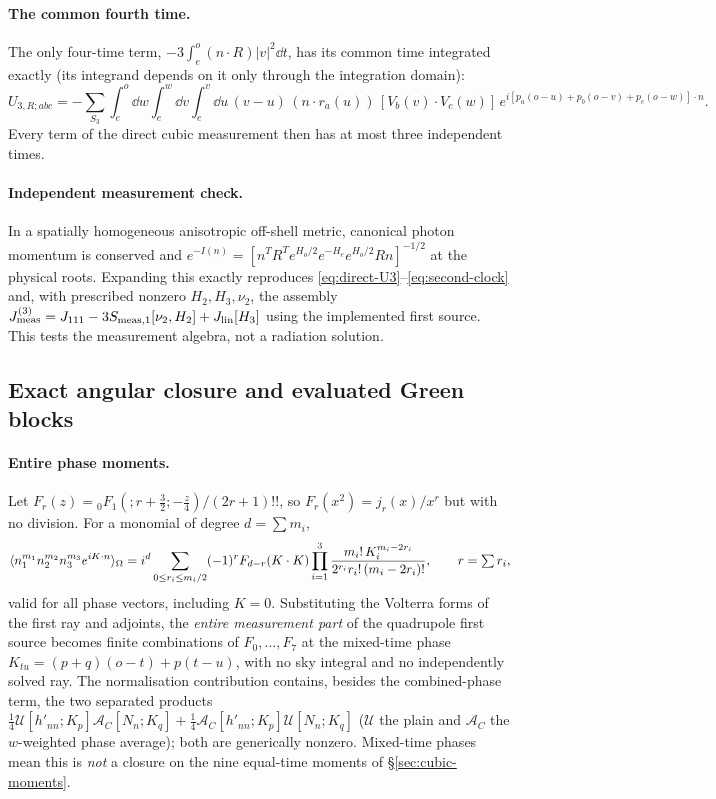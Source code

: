 \paragraph{The common fourth time.} The only four-time term,
$-3\int_e^o(n\cdot R)|v|^2\dd t$, has its common time integrated exactly (its integrand depends on
it only through the integration domain):
\[
 U_{3,R;abc}=-\sum_{S_3}\int_e^o\!\dd w\!\int_e^w\!\dd v\!\int_e^v\!\dd u\,(v-u)\,
 (n\cdot r_a(u))\,[V_b(v)\cdot V_c(w)]\,e^{i[p_a(o-u)+p_b(o-v)+p_c(o-w)]\cdot n}.
\]
Every term of the direct cubic measurement then has at most three independent times.

\paragraph{Independent measurement check.} In a spatially homogeneous anisotropic off-shell
metric, canonical photon momentum is conserved and
$e^{-I(n)}=[n^TR^Te^{H_o/2}e^{-H_e}e^{H_o/2}Rn]^{-1/2}$ at the physical roots. Expanding this
exactly reproduces \eqref{eq:direct-U3}--\eqref{eq:second-clock} and, with prescribed nonzero
$H_2,H_3,\nu_2$, the assembly $J_{\rm meas}^{(3)}=J_{111}-3S_{{\rm meas},1}[\nu_2,H_2]+J_{\rm lin}[H_3]$
using the implemented first source. This tests the measurement algebra, not a radiation solution.

\subsection{Exact angular closure and evaluated Green blocks}\label{sec:angular-green}
\paragraph{Entire phase moments.} Let
$F_r(z)={}_0F_1(;r+\frac32;-\frac z4)/(2r+1)!!$, so $F_r(x^2)=j_r(x)/x^r$ but with no
division. For a monomial of degree $d=\sum m_i$,
\begin{equation}\label{eq:phase-moments}
 \langle n_1^{m_1}n_2^{m_2}n_3^{m_3}e^{iK\cdot n}\rangle_{\Omega}
 =i^d\sum_{0\le r_i\le m_i/2}(-1)^{r}F_{d-r}(K\cdot K)
 \prod_{i=1}^3\frac{m_i!\,K_i^{m_i-2r_i}}{2^{r_i}r_i!\,(m_i-2r_i)!},\qquad r=\textstyle\sum r_i,
\end{equation}
valid for all phase vectors, including $K=0$. Substituting the Volterra forms of the first ray
and adjoints, the \emph{entire measurement part} of the quadrupole first source becomes finite
combinations of $F_0,\dots,F_7$ at the mixed-time phase $K_{tu}=(p+q)(o-t)+p(t-u)$, with no
sky integral and no independently solved ray. The normalisation contribution contains, besides
the combined-phase term, the two separated products
$\frac14\mathcal U[h'_{nn};K_p]\mathcal A_C[N_n;K_q]+\frac14\mathcal A_C[h'_{nn};K_p]\mathcal U[N_n;K_q]$
($\mathcal U$ the plain and $\mathcal A_C$ the $w$-weighted phase average); both are generically
nonzero. Mixed-time phases mean this is \emph{not} a closure on the nine equal-time moments of
\S\ref{sec:cubic-moments}.

